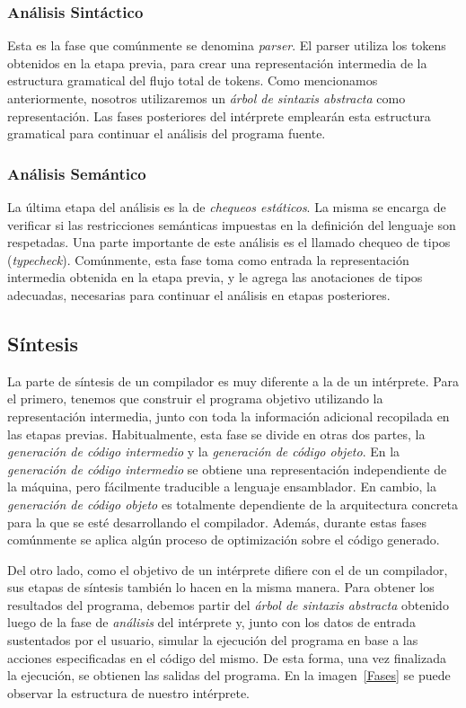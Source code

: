 \subsubsection{Análisis Sintáctico}

Esta es la fase que comúnmente se denomina \textit{parser}.
El parser utiliza los tokens obtenidos en la etapa previa, para crear una representación intermedia de la estructura gramatical del flujo total de tokens.
Como mencionamos anteriormente, nosotros utilizaremos un \textit{árbol de sintaxis abstracta} como representación.
Las fases posteriores del intérprete emplearán esta estructura gramatical para continuar el análisis del programa fuente.

\subsubsection{Análisis Semántico}

La última etapa del análisis es la de \textit{chequeos estáticos}.
La misma se encarga de verificar si las restricciones semánticas impuestas en la definición del lenguaje son respetadas.
Una parte importante de este análisis es el llamado chequeo de tipos (\textit{typecheck}).
Comúnmente, esta fase toma como entrada la representación intermedia obtenida en la etapa previa, y le agrega las anotaciones de tipos adecuadas, necesarias para continuar el análisis en etapas posteriores.

\subsection{Síntesis}

La parte de síntesis de un compilador es muy diferente a la de un intérprete.
Para el primero, tenemos que construir el programa objetivo utilizando la representación intermedia, junto con toda la información adicional recopilada en las etapas previas.
Habitualmente, esta fase se divide en otras dos partes, la \textit{generación de código intermedio} y la \textit{generación de código objeto}.
En la \textit{generación de código intermedio} se obtiene una representación independiente de la máquina, pero fácilmente traducible a lenguaje ensamblador.
En cambio, la \textit{generación de código objeto} es totalmente dependiente de la arquitectura concreta para la que se esté desarrollando el compilador.
Además, durante estas fases comúnmente se aplica algún proceso de optimización sobre el código generado.

Del otro lado, como el objetivo de un intérprete difiere con el de un compilador, sus etapas de síntesis también lo hacen en la misma manera.
Para obtener los resultados del programa, debemos partir del \textit{árbol de sintaxis abstracta} obtenido luego de la fase de \textit{análisis} del intérprete y, junto con los datos de entrada sustentados por el usuario, simular la ejecución del programa en base a las acciones especificadas en el código del mismo.
De esta forma, una vez finalizada la ejecución, se obtienen las salidas del programa.
En la imagen~\ref{Fases} se puede observar la estructura de nuestro intérprete.

